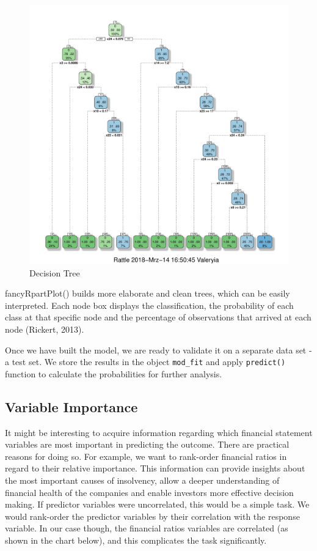 \documentclass{article}
\begin{document}
\begin{figure}
\caption{Decision Tree}
\includegraphics[scale=1]{../CART/fancyRpartPlot.pdf}
\end{figure}

fancyRpartPlot() builds more elaborate and clean trees, which can be easily interpreted. Each node box displays the classification, the probability of each class at that specific node and the percentage of observations that arrived at each node (Rickert, 2013). 

Once we have built the model, we are ready to validate it on a separate data set - a test set. We store the results in the object \texttt{mod\_fit} and apply \texttt{predict()} function to calculate the probabilities for further analysis. 

\subsection{Variable Importance}

It might be interesting to acquire information regarding which financial statement variables are most important in predicting the outcome. There are practical reasons for doing so. For example, we want to rank-order financial ratios in regard to their relative importance. This information can provide insights about the most important causes of insolvency, allow a deeper understanding of financial health of the companies and enable investors more effective decision making. If predictor variables were uncorrelated, this would be a simple task. We would rank-order the predictor variables by their correlation with the response variable. In our case though, the financial ratios variables are correlated (as shown in the chart below), and this complicates the task significantly.
 
\end{document}
